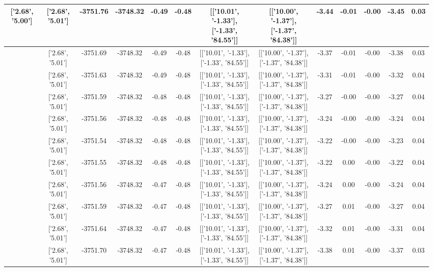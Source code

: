\begin{table}[htbp]
\begin{adjustbox}{angle=90}
\begin{tabular}{|c|c|c|c|c|c|c|c|c|c|c|c|c|}
 ['2.68', '5.00'] & ['2.68', '5.01'] & -3751.76 & -3748.32 & -0.49 & -0.48 & [['10.01', '-1.33'], ['-1.33', '84.55']] & [['10.00', '-1.37'], ['-1.37', '84.38']] & -3.44 & -0.01 & -0.00 & -3.45 & 0.03\\ \hline
 ['2.68', '5.00'] & ['2.68', '5.01'] & -3751.69 & -3748.32 & -0.49 & -0.48 & [['10.01', '-1.33'], ['-1.33', '84.55']] & [['10.00', '-1.37'], ['-1.37', '84.38']] & -3.37 & -0.01 & -0.00 & -3.38 & 0.03\\ \hline
 ['2.68', '5.00'] & ['2.68', '5.01'] & -3751.63 & -3748.32 & -0.49 & -0.48 & [['10.01', '-1.33'], ['-1.33', '84.55']] & [['10.00', '-1.37'], ['-1.37', '84.38']] & -3.31 & -0.01 & -0.00 & -3.32 & 0.04\\ \hline
 ['2.68', '5.00'] & ['2.68', '5.01'] & -3751.59 & -3748.32 & -0.48 & -0.48 & [['10.01', '-1.33'], ['-1.33', '84.55']] & [['10.00', '-1.37'], ['-1.37', '84.38']] & -3.27 & -0.00 & -0.00 & -3.27 & 0.04\\ \hline
 ['2.68', '5.01'] & ['2.68', '5.01'] & -3751.56 & -3748.32 & -0.48 & -0.48 & [['10.01', '-1.33'], ['-1.33', '84.55']] & [['10.00', '-1.37'], ['-1.37', '84.38']] & -3.24 & -0.00 & -0.00 & -3.24 & 0.04\\ \hline
 ['2.68', '5.01'] & ['2.68', '5.01'] & -3751.54 & -3748.32 & -0.48 & -0.48 & [['10.01', '-1.33'], ['-1.33', '84.55']] & [['10.00', '-1.37'], ['-1.37', '84.38']] & -3.22 & -0.00 & -0.00 & -3.23 & 0.04\\ \hline
 ['2.68', '5.01'] & ['2.68', '5.01'] & -3751.55 & -3748.32 & -0.48 & -0.48 & [['10.01', '-1.33'], ['-1.33', '84.55']] & [['10.00', '-1.37'], ['-1.37', '84.38']] & -3.22 & 0.00 & -0.00 & -3.22 & 0.04\\ \hline
 ['2.69', '5.01'] & ['2.68', '5.01'] & -3751.56 & -3748.32 & -0.47 & -0.48 & [['10.01', '-1.33'], ['-1.33', '84.55']] & [['10.00', '-1.37'], ['-1.37', '84.38']] & -3.24 & 0.00 & -0.00 & -3.24 & 0.04\\ \hline
 ['2.69', '5.01'] & ['2.68', '5.01'] & -3751.59 & -3748.32 & -0.47 & -0.48 & [['10.01', '-1.33'], ['-1.33', '84.55']] & [['10.00', '-1.37'], ['-1.37', '84.38']] & -3.27 & 0.01 & -0.00 & -3.27 & 0.04\\ \hline
 ['2.69', '5.01'] & ['2.68', '5.01'] & -3751.64 & -3748.32 & -0.47 & -0.48 & [['10.01', '-1.33'], ['-1.33', '84.55']] & [['10.00', '-1.37'], ['-1.37', '84.38']] & -3.32 & 0.01 & -0.00 & -3.31 & 0.04\\ \hline
 ['2.69', '5.01'] & ['2.68', '5.01'] & -3751.70 & -3748.32 & -0.47 & -0.48 & [['10.01', '-1.33'], ['-1.33', '84.55']] & [['10.00', '-1.37'], ['-1.37', '84.38']] & -3.38 & 0.01 & -0.00 & -3.37 & 0.03\\ \hline

\end{tabular}
\end{adjustbox}
\end{table}
